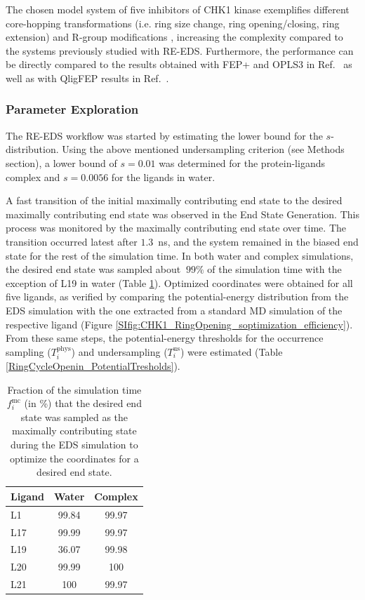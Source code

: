The chosen model system of five inhibitors of CHK1 kinase exemplifies different core-hopping transformations (i.e. ring size change, ring opening/closing, ring extension) and R-group modifications \cite{Wang2017}, increasing the complexity compared to the systems previously studied with RE-EDS. Furthermore, the performance can be directly compared to the results obtained with FEP+ and OPLS3 in Ref.~\cite{Wang2017} as well as with QligFEP results in Ref.~\cite{Jespers2019}.

\subsubsection{Parameter Exploration}
The RE-EDS workflow was started by estimating the lower bound for the $s$-distribution. Using the above mentioned undersampling criterion (see Methods section), a lower bound of $s=0.01$ was determined for the protein-ligands complex and $s=0.0056$ for the ligands in water. 

A fast transition of the initial maximally contributing end state to the desired maximally contributing end state was observed in the End State Generation. This process was monitored by the maximally contributing end state over time.
The transition occurred latest after $1.3$~ns, and the system remained in the biased end state for the rest of the simulation time.
In both water and complex simulations, the desired end state was sampled about $~99\%$ of the simulation time with the exception of L19 in water (Table \ref{SItab:RingCycleOpenin_sampling_fraction_optimizedStates}).
Optimized coordinates were obtained for all five ligands, as verified by comparing the potential-energy distribution from the EDS simulation with the one extracted from a standard MD simulation of the respective ligand (Figure \ref{SIfig:CHK1_RingOpening_soptimization_efficiency}). 
From these same steps, the potential-energy thresholds for the occurrence sampling ($T_{i}^{\text{phys}}$) and undersampling ($T_{i}^{\text{us}}$) were estimated (Table \ref{RingCycleOpenin_PotentialTresholds}).

\begin{table}[H]
\centering
\caption{Fraction of the simulation time $f_i^{\text{mc}}$ (in \%) that the desired end state was sampled as the maximally contributing state during the EDS simulation to optimize the coordinates for a desired end state.}
\label{SItab:RingCycleOpenin_sampling_fraction_optimizedStates}
\begin{adjustbox}{max width=\textwidth}

\begin{tabular}{ l | c c }
 Ligand & Water  & Complex \\ 
 \hline
     L1 & 99.84 & 99.97 \\ 
     L17 & 99.99 & 99.97\\
     L19 & 36.07 &  99.98\\
     L20 & 99.99 & 100\\
     L21 & 100 & 99.97 \\
\end{tabular}
\end{adjustbox}
\end{table}

